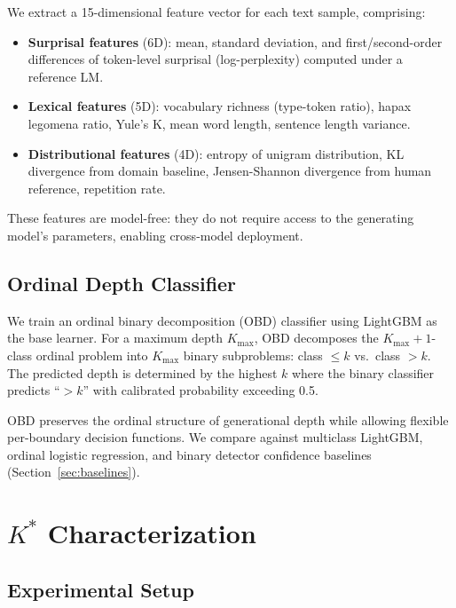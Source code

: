 \documentclass[11pt,a4paper]{article}
\begin{document}
We extract a 15-dimensional feature vector for each text sample, comprising:
\begin{itemize}
    \item \textbf{Surprisal features} (6D): mean, standard deviation, and first/second-order differences of token-level surprisal (log-perplexity) computed under a reference LM.
    \item \textbf{Lexical features} (5D): vocabulary richness (type-token ratio), hapax legomena ratio, Yule's K, mean word length, sentence length variance.
    \item \textbf{Distributional features} (4D): entropy of unigram distribution, KL divergence from domain baseline, Jensen-Shannon divergence from human reference, repetition rate.
\end{itemize}
These features are model-free: they do not require access to the generating model's parameters, enabling cross-model deployment.

\subsection{Ordinal Depth Classifier}

We train an ordinal binary decomposition (OBD) classifier using LightGBM as the base learner. For a maximum depth $K_{\max}$, OBD decomposes the $K_{\max}\!+\!1$-class ordinal problem into $K_{\max}$ binary subproblems: class $\leq k$ vs.\ class $> k$. The predicted depth is determined by the highest $k$ where the binary classifier predicts ``$> k$'' with calibrated probability exceeding 0.5.

OBD preserves the ordinal structure of generational depth while allowing flexible per-boundary decision functions. We compare against multiclass LightGBM, ordinal logistic regression, and binary detector confidence baselines (Section~\ref{sec:baselines}).

\section{$K^*$ Characterization}
\label{sec:kstar}

\subsection{Experimental Setup}
\end{document}

